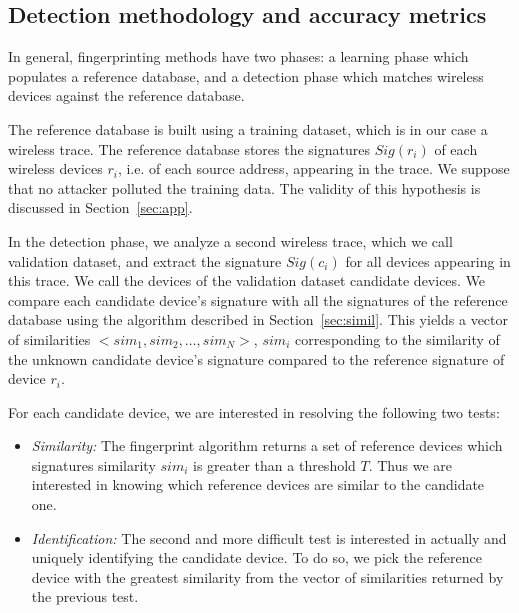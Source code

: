 \documentclass[10pt, conference, compsocconf, letterpaper]{IEEEtran}
\begin{document}
  


 
 






\subsection{Detection methodology and accuracy metrics}
\label{ssec:detection}
In general, fingerprinting methods have two phases: a learning phase which populates a reference database, and a detection phase which matches wireless devices against the reference database.

The reference database is built using a training dataset, which is in our case a wireless trace.
The reference database stores the signatures $Sig(r_i)$ of each wireless devices $r_i$, i.e. of each source address, appearing in the trace.
We suppose that no attacker polluted the training data.
The validity of this hypothesis is discussed in Section~\ref{sec:app}. 

In the detection phase, we analyze a second wireless trace, which we call validation dataset, 
and extract the signature $Sig(c_i)$ for all devices appearing in this trace. 
We call the devices of the validation dataset candidate devices. We compare
each candidate device's signature with all the signatures of the reference database using
the algorithm described in Section~\ref{sec:simil}. 
This yields a vector of similarities $<sim_1,sim_2,\ldots,sim_N>$, $sim_i$ corresponding 
to the similarity of the unknown candidate device's signature compared to the reference signature of device $r_i$.

For each candidate device, we are interested in resolving the following two tests: 
\begin{itemize}
\item \emph{Similarity:} The fingerprint algorithm returns a set of reference devices which signatures similarity
$sim_i$ is greater than a threshold $T$. Thus we are interested in knowing which reference devices are
similar to the candidate one.

\item \emph{Identification:} The second and more difficult test is interested in actually and uniquely identifying the candidate device.
To do so, we pick the reference device with the greatest similarity from the vector of similarities returned by the previous test. 

\end{itemize}
\end{document}
